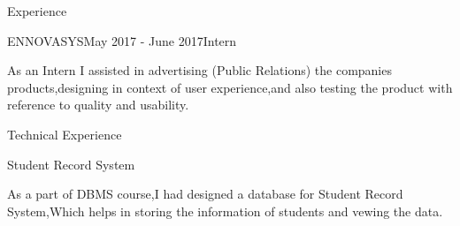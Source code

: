 \documentclass{resume} %
\newcommand{\tab}[1]{\hspace{.2667\textwidth}\rlap{#1}}
\newcommand{\itab}[1]{\hspace{0em}\rlap{#1}}
\begin{document}




\begin{rSection}{Experience}




\begin{rSubsection}{ENNOVASYS}{May 2017 - June 2017}{Intern}{}
\item As an Intern I assisted in advertising (Public Relations) the companies products,designing in context of user experience,and also testing the product with reference to quality and usability.
 
\end{rSubsection}

\end{rSection}
\begin{rSection}{Technical Experience}




\begin{rSubsection}{Student Record System}{}{}{}
\item As a part of DBMS course,I had designed a database for Student Record System,Which helps in storing the information of students and vewing the data.
 
\end{rSubsection}

\end{rSection}

\end{document}
